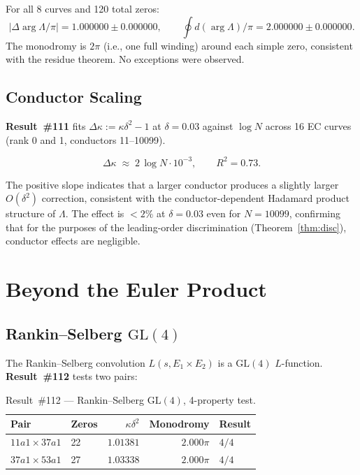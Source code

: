 \documentclass[11pt, a4paper]{article}
\theoremstyle{plain}
\theoremstyle{definition}
\begin{document}
\medskip
\noindent For all 8 curves and 120 total zeros:
\[
  |\Delta\!\arg\Lambda / \pi| = 1.000000\pm 0.000000,
  \qquad
  \oint d(\arg\Lambda)/\pi = 2.000000\pm 0.000000.
\]
The monodromy is $2\pi$ (i.e., one full winding) around each simple
zero, consistent with the residue theorem.  No exceptions were observed.


\subsection{Conductor Scaling}
\label{ssec:conductor}

\textbf{Result~\#111} fits $\Delta\kappa := \kappa\delta^{2}-1$ at
$\delta=0.03$ against $\log N$ across 16 EC curves
(rank 0 and 1, conductors 11--10099).

\[
  \Delta\kappa \;\approx\; 2\,\log N \cdot 10^{-3}, \qquad R^{2}=0.73.
\]

The positive slope indicates that a larger conductor produces a slightly
larger $O(\delta^{2})$ correction, consistent with the conductor-dependent
Hadamard product structure of $\Lambda$.  The effect is $<2\%$ at
$\delta=0.03$ even for $N=10099$, confirming that for the purposes of
the leading-order discrimination (Theorem~\ref{thm:disc}), conductor
effects are negligible.


\section{Beyond the Euler Product}
\label{sec:beyond}

\subsection{Rankin--Selberg $\mathrm{GL}(4)$}
\label{sec:gl4rs}

The Rankin--Selberg convolution $L(s, E_{1}\times E_{2})$ is a
$\mathrm{GL}(4)$ $L$-function.  \textbf{Result~\#112} tests two pairs:

\begin{table}[ht]
\centering
\caption{Result~\#112 — Rankin--Selberg $\mathrm{GL}(4)$, 4-property test.}
\label{tab:rs112}
\small
\begin{tabular}{llrrl}
\toprule
Pair & Zeros & $\kappa\delta^{2}$ & Monodromy & Result \\
\midrule
$11a1 \times 37a1$ & 22 & $1.01381$ & $2.000\pi$ & $4/4$ \\
$37a1 \times 53a1$ & 27 & $1.03338$ & $2.000\pi$ & $4/4$ \\
\bottomrule
\end{tabular}
\end{table}
\end{document}
